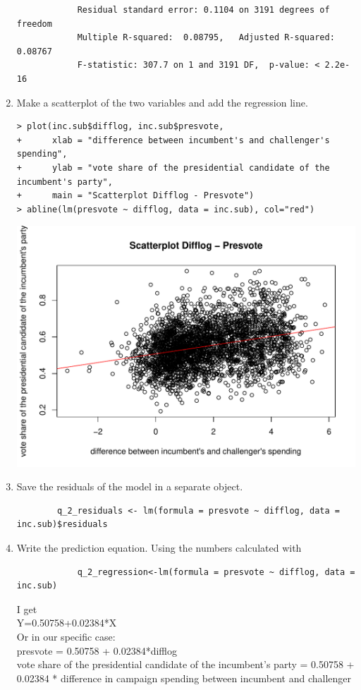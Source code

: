 \documentclass[12pt,letterpaper]{article}
\begin{document}
\begin{enumerate}
\begin{verbatim}
			Residual standard error: 0.1104 on 3191 degrees of freedom
			Multiple R-squared:  0.08795,	Adjusted R-squared:  0.08767 
			F-statistic: 307.7 on 1 and 3191 DF,  p-value: < 2.2e-16
		\end{verbatim}
		\item Make a scatterplot of the two variables and add the regression line.  \\
		\begin{verbatim}
> plot(inc.sub$difflog, inc.sub$presvote, 
+      xlab = "difference between incumbent's and challenger's spending",
+      ylab = "vote share of the presidential candidate of the incumbent's party",
+      main = "Scatterplot Difflog - Presvote")
> abline(lm(presvote ~ difflog, data = inc.sub), col="red")
	\end{verbatim}
	 \includegraphics[width=\textwidth,height=\textheight,keepaspectratio]{Q_2_Plot}
		\item Save the residuals of the model in a separate object.	\\
		\begin{verbatim}
		q_2_residuals <- lm(formula = presvote ~ difflog, data = inc.sub)$residuals
	\end{verbatim}
		\item Write the prediction equation.
		Using the numbers calculated with
		\begin{verbatim}
			q_2_regression<-lm(formula = presvote ~ difflog, data = inc.sub)
		\end{verbatim}
		I get \\
		Y=0.50758+0.02384*X \\
		Or in our specific case: \\
		presvote = 0.50758 + 0.02384*difflog \\
		vote share of the presidential candidate of the incumbent's party = 0.50758 + 0.02384 * difference in campaign spending between incumbent and challenger
	\end{enumerate}
	
\end{document}
